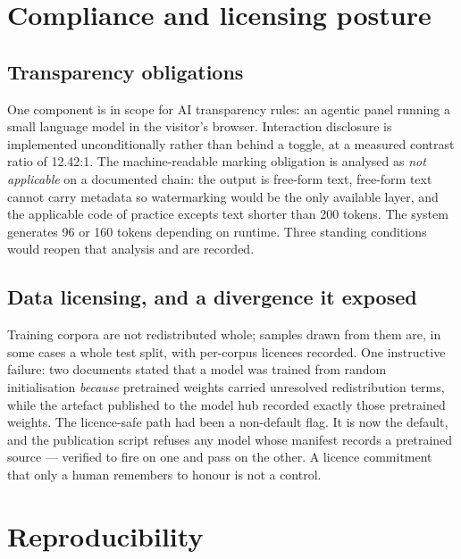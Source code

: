 \documentclass[11pt,a4paper]{article}
\begin{document}
\section{Compliance and licensing posture}

\subsection{Transparency obligations}
One component is in scope for AI transparency rules: an agentic panel running a small language model
in the visitor's browser. Interaction disclosure is implemented unconditionally rather than behind a
toggle, at a measured contrast ratio of 12.42:1. The machine-readable marking obligation is analysed
as \emph{not applicable} on a documented chain: the output is free-form text, free-form text cannot
carry metadata so watermarking would be the only available layer, and the applicable code of
practice excepts text shorter than 200 tokens. The system generates 96 or 160 tokens depending on
runtime. Three standing conditions would reopen that analysis and are recorded.

\subsection{Data licensing, and a divergence it exposed}
Training corpora are not redistributed whole; samples drawn from them are, in some cases a whole test
split, with per-corpus licences recorded. One instructive failure: two documents stated that a model
was trained from random initialisation \emph{because} pretrained weights carried unresolved
redistribution terms,
while the artefact published to the model hub recorded exactly those pretrained weights. The
licence-safe path had been a non-default flag. It is now the default, and the publication script
refuses any model whose manifest records a pretrained source --- verified to fire on one and pass on
the other. A licence commitment that only a human remembers to honour is not a control.

\section{Reproducibility}
\end{document}
